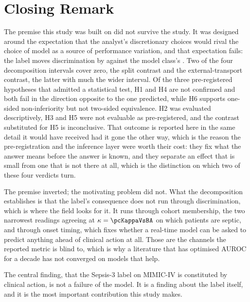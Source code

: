 \section{Closing Remark}

The premise this study was built on did not survive the study. It was designed
around the expectation that the analyst's discretionary choices would rival the
choice of model as a source of performance variation, and that expectation
fails: the label moves discrimination by \pcSpreadLabel{} against the model
class's \pcSpreadModelClass{}. Two of the four decomposition intervals cover
zero, the split contrast and the external-transport contrast, the latter with
much the wider interval. Of the
three pre-registered hypotheses that admitted a statistical test, H1 and H4
are not confirmed and both fail in the direction opposite to the one predicted,
while H6 supports one-sided non-inferiority but not two-sided equivalence. H2
was evaluated descriptively, H3 and H5 were not evaluable as pre-registered,
and the contrast substituted for H5 is inconclusive. That outcome is reported here in the
same detail it would have received had it gone the other way, which is the
reason the pre-registration and the inference layer were worth their cost: they
fix what the answer means before the answer is known, and they separate an
effect that is small from one that is not there at all, which is the
distinction on which two of these four verdicts turn.

The premise inverted; the motivating problem did not. What the decomposition
establishes is that the label's consequence does not run through
discrimination, which is where the field looks for it. It runs through cohort
membership, the two narrowest readings agreeing at $\kappa = \pcKappaVsBA$ on
which patients are septic, and through onset timing, which fixes whether a
real-time model can be asked to predict anything ahead of clinical action at
all. Those are the channels the reported
metric is blind to, which is why a literature that has optimised AUROC for a
decade has not converged on models that help.

The central finding, that the Sepsis-3 label on MIMIC-IV is constituted by
clinical action, is not a failure of the model. It is a finding about the label
itself, and it is the most important contribution this study makes.

